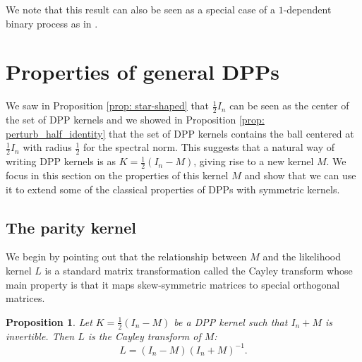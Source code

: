 \documentclass{article}
\numberwithin{equation}{section}
\theoremstyle{plain}
\newtheorem{proposition}{Proposition}[section]
\begin{document}
\noindent We note that this result can also be seen as a special case of a $1$-dependent binary process as in \cite{Borodin09}.

\section{Properties of general DPPs}\label{sec: prop_DPPs}


\noindent We saw in Proposition \ref{prop: star-shaped} that $\frac{1}{2}I_n$ can be seen as the center of the set of DPP kernels and we showed in Proposition \ref{prop: perturb_half_identity} that the set of DPP kernels contains the ball centered at $\frac{1}{2}I_n$ with radius $\frac{1}{2}$ for the spectral norm. This suggests that a natural way of writing DPP kernels is as $K=\frac{1}{2}(I_n-M)$, giving rise to a new kernel $M$. We focus in this section on the properties of this kernel $M$ and show that we can use it to extend some of the classical properties of DPPs with symmetric kernels.

\subsection{The parity kernel}

We begin by pointing out that the relationship between $M$ and the likelihood kernel $L$ is a standard matrix transformation called the Cayley transform whose main property is that it maps skew-symmetric matrices to special orthogonal matrices.

\begin{proposition}\label{prop: Cayley}
Let $K=\frac{1}{2}(I_n-M)$ be a DPP kernel such that $I_n+M$ is invertible. Then $L$ is the Cayley transform of $M$:
\[L=(I_n-M)(I_n+M)^{-1}.\]
\end{proposition}
\end{document}
